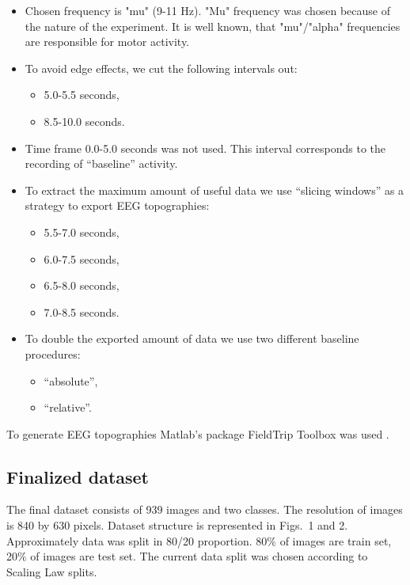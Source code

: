 \documentclass[conference]{IEEEtran}
\begin{document}
\begin{itemize}
    \item Chosen frequency is "mu" (9-11 Hz). "Mu" frequency was chosen because of the nature of the experiment. It is well known, that "mu"/"alpha" frequencies are responsible for motor activity.
    \item To avoid edge effects, we cut the following intervals out:
            \begin{itemize}
                \item 5.0-5.5 seconds,
                \item 8.5-10.0 seconds.
            \end{itemize}
    \item Time frame 0.0-5.0 seconds was not used. This interval corresponds to the recording of ``baseline'' activity.
    \item To extract the maximum amount of useful data we use ``slicing windows'' as a strategy to export EEG topographies:
            \begin{itemize}
                \item 5.5-7.0 seconds,
                \item 6.0-7.5 seconds,
                \item 6.5-8.0 seconds,
                \item 7.0-8.5 seconds.
            \end{itemize}
    \item To double the exported amount of data we use two different baseline procedures:
            \begin{itemize}
                \item ``absolute'',
                \item ``relative''.
            \end{itemize}
\end{itemize}

To generate EEG topographies Matlab's package FieldTrip Toolbox was used \cite{maris2007nonparametric}.

\subsection{Finalized dataset}

The final dataset consists of 939 images and two classes. The resolution of images is 840 by 630 pixels. Dataset structure is represented in Figs.~1 and 2. Approximately data was split in 80/20 proportion. 80$\%$ of images are train set, 20$\%$ of images are test set. The current data split was chosen according to Scaling Law \cite{guyon1997scaling} splits.
\end{document}
